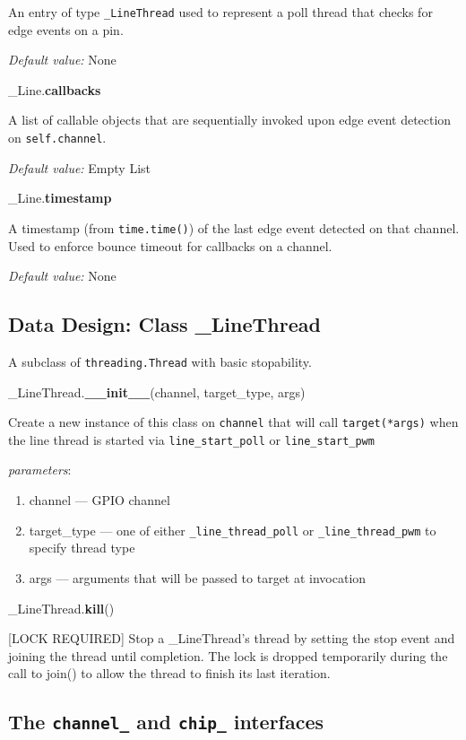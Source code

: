 \documentclass[12pt]{article}
\begin{document}
An entry of type \texttt{\_LineThread} used to represent a poll thread that checks for edge events on a pin.

\textit{Default value:} None

\noindent \_Line.\textbf{callbacks}

A list of callable objects that are sequentially invoked upon edge event detection on \texttt{self.channel}.

\textit{Default value:} Empty List

\noindent \_Line.\textbf{timestamp}

A timestamp (from \texttt{time.time()}) of the last edge event detected on that channel. Used to enforce bounce timeout for callbacks on a channel.

\textit{Default value:} None


\subsection{Data Design: Class \_LineThread}

A subclass of \texttt{threading.Thread} with basic stopability. 

\medskip

\noindent \_LineThread.\textbf{\_\_init\_\_}(channel, target\_type, args)
        
Create a new instance of this class on \texttt{channel} that will call \texttt{target(*args)} when the line thread is started via \texttt{line\_start\_poll} or \texttt{line\_start\_pwm}

\textit{parameters}:
\begin{enumerate}
        \item channel --- GPIO channel
	\item target\_type --- one of either \texttt{\_line\_thread\_poll} or \texttt{\_line\_thread\_pwm} to specify thread type
        \item args --- arguments that will be passed to target at invocation
\end{enumerate}
 

\noindent \_LineThread.\textbf{kill}()

[LOCK REQUIRED] Stop a \_LineThread's thread by setting the stop event and joining the thread until completion.
The lock is dropped temporarily during the call to join() to allow the thread to finish its last iteration.

\subsection{The  \texttt{channel\_} and \texttt{chip\_} interfaces}
\end{document}
